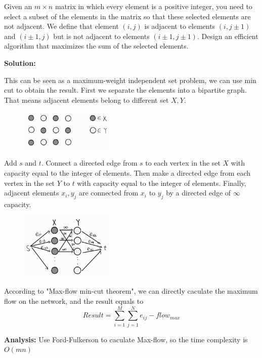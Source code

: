 \problem{}
Given an $m \times n$ matrix in which every element is a positive integer, you need to select a subset of the elements in the matrix so that these selected elements are not adjacent. We define that element $(i, j)$ is adjacent to elements $(i, j \pm 1)$ and $(i \pm 1, j)$ but is not adjacent to elements $(i \pm 1, j \pm 1)$. Design an efficient algorithm that maximizes the sum of the selected elements.

\textbf{Solution:}

This can be seen as a maximum-weight independent set problem, we can use min cut to obtain the result. First we separate the elements into a bipartite graph. That means adjacent elements belong to different set $X,Y$.
\begin{figure}[htbp]
	\begin{center}	
		\includegraphics[width=0.4\textwidth]{HW2/1.jpg}
	\end{center}
\end{figure} 

Add $s$ and $t$. Connect a directed edge from $s$ to each vertex in the set $X$ with capacity equal to the integer of elements. Then make a directed edge from each vertex in the set $Y$ to $t$ with capacity equal to the integer of elements. Finally, adjacent elements $x_i, y_j$ are connected from $x_i$ to $y_j$ by a directed edge of $\infty$ capacity.

\begin{figure}[htbp]
	\begin{center}	
		\includegraphics[width=0.4\textwidth]{HW2/2.jpg}
	\end{center}
\end{figure} 

According to "Max-flow min-cut theorem", we can directly caculate the maximum flow on the network, and the result equals to
$$Result =  \sum_{i=1}^{M}\sum_{j=1}^{N}e_{ij} - flow_{max}$$

\textbf{Analysis:}
Use Ford-Fulkerson to caculate Max-flow, so the time complexity is $O(mn)$